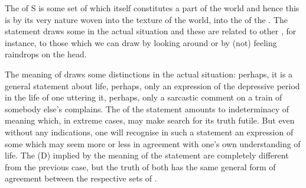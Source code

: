 The  of S is some set of  which itself constitutes a
part of the world and hence this  is by its very nature woven into the
texture of the world, into the  of the .  The
statement  draws some  in the actual situation
and these are related to other , for instance, to those which
we can draw by looking around or by (not) feeling raindrops on the head.

The meaning of  draws some distinctions in the
actual situation: perhaps, it is a general statement about life, perhaps, only
an expression of the depressive period in the life of one uttering it, perhaps,
only a sarcastic comment on a train of somebody else's complains. The
 of the statement amounts to indeterminacy of meaning which, in
extreme cases, may make search for its truth futile. But even without any
 indications, one will recognise in such a statement an expression
of some  which may seem more or less in agreement with one's own
understanding of life. The  (D) implied by the meaning of the
statement are completely different from the previous case, but the 
truth of both has the same general form of agreement between the
respective sets of . 


